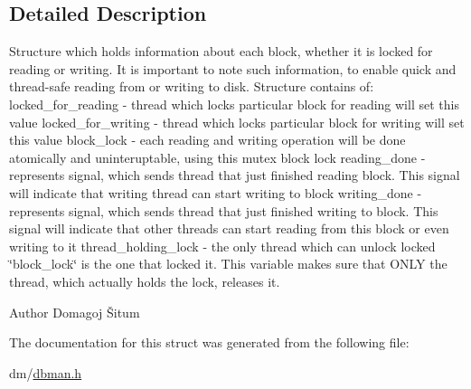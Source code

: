 \subsection{Detailed Description}
Structure which holds information about each block, whether it is locked for reading or writing. It is important to note such information, to enable quick and thread-\/safe reading from or writing to disk. Structure contains of\+: locked\+\_\+for\+\_\+reading -\/ thread which locks particular block for reading will set this value locked\+\_\+for\+\_\+writing -\/ thread which locks particular block for writing will set this value block\+\_\+lock -\/ each reading and writing operation will be done atomically and uninteruptable, using this mutex block lock reading\+\_\+done -\/ represents signal, which sends thread that just finished reading block. This signal will indicate that writing thread can start writing to block writing\+\_\+done -\/ represents signal, which sends thread that just finished writing to block. This signal will indicate that other threads can start reading from this block or even writing to it thread\+\_\+holding\+\_\+lock -\/ the only thread which can unlock locked \char`\"{}block\+\_\+lock\char`\"{} is the one that locked it. This variable makes sure that O\+N\+L\+Y the thread, which actually holds the lock, releases it. 

\begin{DoxyAuthor}{Author}
Domagoj Šitum 
\end{DoxyAuthor}


The documentation for this struct was generated from the following file\+:\begin{DoxyCompactItemize}
\item 
dm/\hyperlink{dbman_8h}{dbman.\+h}\end{DoxyCompactItemize}
